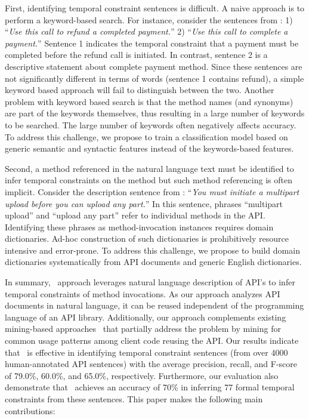 First, identifying temporal constraint sentences is difficult.
A naive approach is to perform a keyword-based search.
For instance, consider the sentences from \paypalAPI: 1) ``\textit{Use this call to refund a completed payment.}'' 2) ``\textit{Use this call to complete a payment.}''
Sentence 1 indicates the temporal constraint that a payment must be completed before the refund call is initiated.
In contrast, sentence 2 is a descriptive statement about complete payment method.
Since these sentences are not significantly different in terms of words (sentence 1 contains refund), a simple keyword based approach will fail to distinguish between the two.  
Another problem with keyword based search is that the method names (and synonyms) are part of the keywords themselves, thus resulting in a large number of keywords to be searched.
The large number of keywords often negatively affects accuracy.
To address this challenge, we propose to train a classification model based on generic semantic and syntactic features instead of the keywords-based features.    

Second, a method referenced in the natural language text must be identified to infer temporal constraints on the method but such method referencing is often implicit.
Consider the description sentence from \amazonAPI: ``\textit{You must initiate a multipart upload before you can upload any part.}''
In this sentence, phrases ``multipart upload'' and ``upload any part'' refer to individual methods in the API.
Identifying these phrases as method-invocation instances requires domain dictionaries.
Ad-hoc construction of such dictionaries is prohibitively resource intensive and error-prone.
To address this challenge, we propose to build domain dictionaries systematically from API documents and generic English dictionaries.

In summary, \tool\ approach leverages natural language description of API's to infer temporal constraints of method invocations.
As our approach analyzes API documents in natural language, it can be reused independent of the programming language of an API library.
Additionally, our approach complements existing mining-based approaches~\cite{buse2012synthesizing, thummalapenta07parseweb, Wang:2013:MSR, Zhong:2009:MMR} that partially address the problem by mining for common usage patterns among client code reusing the API.
Our results indicate that \tool\ is effective in identifying temporal
constraint sentences (from over
4000 human-annotated API sentences) with the average precision, recall, and F-score
of 79.0\%, 60.0\%, and 65.0\%, respectively.
Furthermore, our evaluation also demonstrate that \tool\ achieves an accuracy of 70\% in inferring 77 formal temporal constraints from these sentences.
This paper makes the following main contributions:


